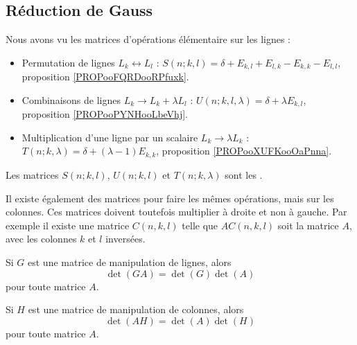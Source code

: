 \subsection{Réduction de Gauss}

\begin{definition}		\label{NORMooDXYZooEdnztA}
	Nous avons vu les matrices d'opérations élémentaire sur les lignes :
	\begin{itemize}
		\item Permutation de lignes \( L_k\leftrightarrow L_l\)  : \( S(n;k,l)=\delta+E_{k,l}+E_{l,k}-E_{k,k}-E_{l,l}\), proposition \ref{PROPooFQRDooRPfuxk}.
		\item Combinaisons de lignes \( L_k\to L_k+\lambda L_l\) : \( U(n;k,l,\lambda)=\delta+\lambda E_{k,l}\), proposition \ref{PROPooPYNHooLbeVhj}.
		\item Multiplication d'une ligne par un scalaire \( L_k\to \lambda L_k\) : \( T(n;k,\lambda)=\delta+(\lambda-1)E_{k,k}\), proposition \ref{PROPooXUFKooOaPnna}.
	\end{itemize}
	Les matrices \( S(n;k,l)\), \( U(n;k,l)\) et \( T(n;k,\lambda)\) sont les .
\end{definition}


\begin{normaltext}		\label{NORMooDXYZooEdnztA}
	Il existe également des matrices pour faire les mêmes opérations, mais sur les colonnes. Ces matrices doivent toutefois multiplier à droite et non à gauche. Par exemple il existe une matrice \( C(n,k,l)\) telle que \( AC(n,k,l)\) soit la matrice \( A\), avec les colonnes \( k\) et \( l\) inversées.

\end{normaltext}


\begin{lemma}		\label{LEMooDXSZooVpbCRj}
	Si \( G\) est une matrice de manipulation de lignes, alors
	\begin{equation}        \label{EQooLQTVooBYjVYl}
		\det(GA)=\det(G)\det(A)
	\end{equation}
	pour toute matrice \( A\).

	Si \( H\) est une matrice de manipulation de colonnes, alors
	\begin{equation}
		\det(AH)=\det(A)\det(H)
	\end{equation}
	pour toute matrice \( A\).
\end{lemma}

